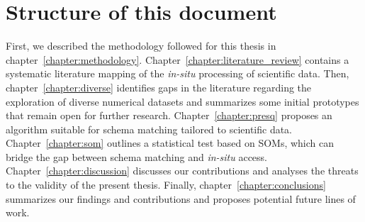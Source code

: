 \section{Structure of this document}

First, we described the methodology followed for this thesis in chapter~\ref{chapter:methodology}.
Chapter~\ref{chapter:literature_review} contains a systematic literature mapping
of the \emph{in-situ} processing of scientific data.
Then, chapter~\ref{chapter:diverse} identifies gaps in the literature regarding
the exploration of diverse numerical datasets and summarizes some initial prototypes
that remain open for further research.
Chapter~\ref{chapter:presq} proposes an algorithm suitable for schema matching
tailored to scientific data. Chapter~\ref{chapter:som} outlines a statistical
test based on \glspl{SOM}, which can bridge the gap between schema matching and
\emph{in-situ} access.
Chapter~\ref{chapter:discussion} discusses our contributions
and analyses the threats to the validity of the present thesis.
Finally, chapter~\ref{chapter:conclusions} summarizes our findings and contributions and proposes potential future lines of work.
